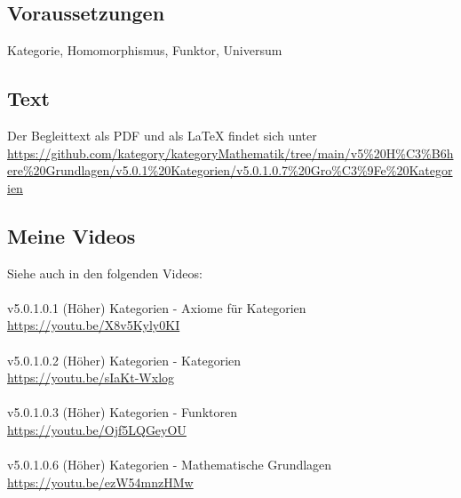 \documentclass[a4paper]{amsart}
\theoremstyle{definition}
\begin{document}
\subsection*{Voraussetzungen}
Kategorie, Homomorphismus, Funktor, Universum

\subsection*{Text}
Der Begleittext als PDF und als LaTeX findet sich unter
{\tiny
   \url{https://github.com/kategory/kategoryMathematik/tree/main/v5%20H%C3%B6here%20Grundlagen/v5.0.1%20Kategorien/v5.0.1.0.7%20Gro%C3%9Fe%20Kategorien}
}

\subsection*{Meine Videos}
Siehe auch in den folgenden Videos:\\
\\
v5.0.1.0.1 (Höher) Kategorien - Axiome für Kategorien\\
\url{https://youtu.be/X8v5Kyly0KI}\\
\\
v5.0.1.0.2 (Höher) Kategorien - Kategorien\\
\url{https://youtu.be/sIaKt-Wxlog}\\
\\
v5.0.1.0.3 (Höher) Kategorien - Funktoren\\
\url{https://youtu.be/Ojf5LQGeyOU}\\
\\
v5.0.1.0.6 (Höher) Kategorien - Mathematische Grundlagen\\
\url{https://youtu.be/ezW54mnzHMw}

\end{document}
